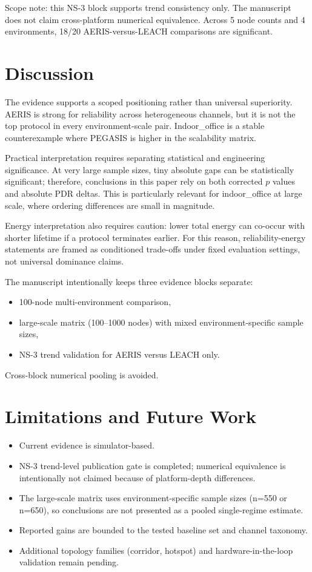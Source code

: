 \documentclass[sensors,article,submit,moreauthors,pdftex]{Definitions/mdpi}
\begin{document}
Scope note: this NS-3 block supports trend consistency only. The manuscript does not claim cross-platform numerical equivalence. Across 5 node counts and 4 environments, 18/20 AERIS-versus-LEACH comparisons are significant.

\section{Discussion}
The evidence supports a scoped positioning rather than universal superiority. AERIS is strong for reliability across heterogeneous channels, but it is not the top protocol in every environment-scale pair. Indoor\_office is a stable counterexample where PEGASIS is higher in the scalability matrix.

Practical interpretation requires separating statistical and engineering significance. At very large sample sizes, tiny absolute gaps can be statistically significant; therefore, conclusions in this paper rely on both corrected $p$ values and absolute PDR deltas. This is particularly relevant for indoor\_office at large scale, where ordering differences are small in magnitude.

Energy interpretation also requires caution: lower total energy can co-occur with shorter lifetime if a protocol terminates earlier. For this reason, reliability-energy statements are framed as conditioned trade-offs under fixed evaluation settings, not universal dominance claims.

The manuscript intentionally keeps three evidence blocks separate:
\begin{itemize}
\item 100-node multi-environment comparison,
\item large-scale matrix (100--1000 nodes) with mixed environment-specific sample sizes,
\item NS-3 trend validation for AERIS versus LEACH only.
\end{itemize}
Cross-block numerical pooling is avoided.

\section{Limitations and Future Work}
\begin{itemize}
\item Current evidence is simulator-based.
\item NS-3 trend-level publication gate is completed; numerical equivalence is intentionally not claimed because of platform-depth differences.
\item The large-scale matrix uses environment-specific sample sizes (n=550 or n=650), so conclusions are not presented as a pooled single-regime estimate.
\item Reported gains are bounded to the tested baseline set and channel taxonomy.
\item Additional topology families (corridor, hotspot) and hardware-in-the-loop validation remain pending.
\end{itemize}
\end{document}
